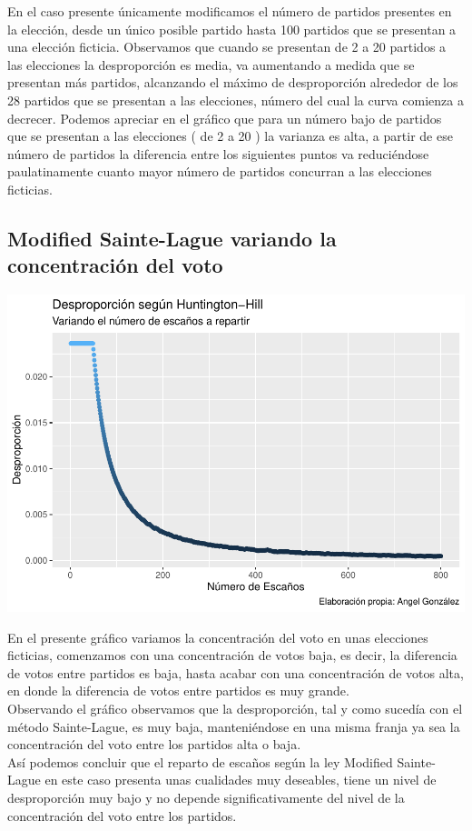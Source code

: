 \documentclass[12pt,a4paper,]{book}
\numberwithin{dummy}{section}
\theoremstyle{ocrenumbox}
\theoremstyle{blacknumex}
\theoremstyle{blacknumbox}
\theoremstyle{ocrenum}
\theoremstyle{ocrenum}
\begin{document}
En el caso presente únicamente modificamos el número de partidos
presentes en la elección, desde un único posible partido hasta 100
partidos que se presentan a una elección ficticia. Observamos que cuando
se presentan de 2 a 20 partidos a las elecciones la desproporción es
media, va aumentando a medida que se presentan más partidos, alcanzando
el máximo de desproporción alrededor de los 28 partidos que se presentan
a las elecciones, número del cual la curva comienza a decrecer. Podemos
apreciar en el gráfico que para un número bajo de partidos que se
presentan a las elecciones ( de 2 a 20 ) la varianza es alta, a partir
de ese número de partidos la diferencia entre los siguientes puntos va
reduciéndose paulatinamente cuanto mayor número de partidos concurran a
las elecciones ficticias.

\hypertarget{modified-sainte-lague-variando-la-concentraciuxf3n-del-voto}{%
\subsection{Modified Sainte-Lague variando la concentración del
voto}\label{modified-sainte-lague-variando-la-concentraciuxf3n-del-voto}}

\begin{center}\includegraphics[width=0.95\linewidth]{figurasR/unnamed-chunk-25-1} \end{center}

En el presente gráfico variamos la concentración del voto en unas
elecciones ficticias, comenzamos con una concentración de votos baja, es
decir, la diferencia de votos entre partidos es baja, hasta acabar con
una concentración de votos alta, en donde la diferencia de votos entre
partidos es muy grande.\\
Observando el gráfico observamos que la desproporción, tal y como
sucedía con el método Sainte-Lague, es muy baja, manteniéndose en una
misma franja ya sea la concentración del voto entre los partidos alta o
baja.\\
Así podemos concluir que el reparto de escaños según la ley Modified
Sainte-Lague en este caso presenta unas cualidades muy deseables, tiene
un nivel de desproporción muy bajo y no depende significativamente del
nivel de la concentración del voto entre los partidos.
\end{document}
